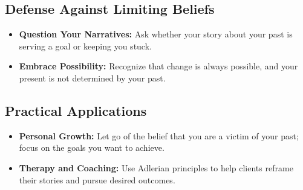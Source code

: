 \subsection*{Defense Against Limiting Beliefs}
\begin{itemize}
    \item \textbf{Question Your Narratives:} Ask whether your story about your past is serving a goal or keeping you stuck.
    \item \textbf{Embrace Possibility:} Recognize that change is always possible, and your present is not determined by your past.
\end{itemize}

\subsection*{Practical Applications}
\begin{itemize}
    \item \textbf{Personal Growth:} Let go of the belief that you are a victim of your past; focus on the goals you want to achieve.
    \item \textbf{Therapy and Coaching:} Use Adlerian principles to help clients reframe their stories and pursue desired outcomes.
\end{itemize}